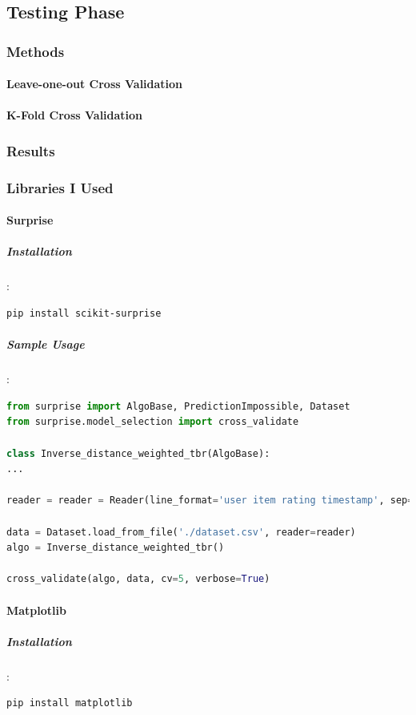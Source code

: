 \documentclass[12pt]{article}
\begin{document}
\subsection{Testing Phase}
\subsubsection{Methods}
\paragraph{Leave-one-out Cross Validation}
\paragraph{K-Fold Cross Validation}
\subsubsection{Results}
\subsubsection{Libraries I Used}
\paragraph{Surprise}
\subparagraph{Installation}:
\begin{lstlisting}[language=bash]
 pip install scikit-surprise
\end{lstlisting}

\subparagraph{Sample Usage}:
\begin{lstlisting}[language=python, caption=Surprise example]
from surprise import AlgoBase, PredictionImpossible, Dataset
from surprise.model_selection import cross_validate

class Inverse_distance_weighted_tbr(AlgoBase):
...

reader = reader = Reader(line_format='user item rating timestamp', sep=';', rating_scale=(1, 5))

data = Dataset.load_from_file('./dataset.csv', reader=reader)
algo = Inverse_distance_weighted_tbr()

cross_validate(algo, data, cv=5, verbose=True)
\end{lstlisting}

\paragraph{Matplotlib}
\subparagraph{Installation}:
\begin{lstlisting}[language=bash]
pip install matplotlib
\end{lstlisting}
\end{document}
